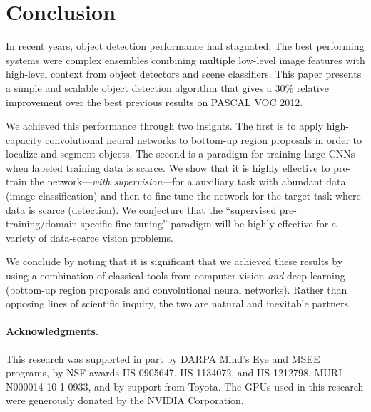 \section{Conclusion}

In recent years, object detection performance had stagnated.
The best performing systems were complex ensembles combining multiple low-level image features with high-level context from object detectors and scene classifiers.
This paper presents a simple and scalable object detection algorithm that gives a 30\% relative improvement over the best previous results on PASCAL VOC 2012.

We achieved this performance through two insights.
The first is to apply high-capacity convolutional neural networks to bottom-up region proposals in order to localize and segment objects.
The second is a paradigm for training large CNNs when labeled training data is scarce. We show that it is highly effective to pre-train the network---\emph{with supervision}---for a auxiliary task with abundant data (image classification) and then to fine-tune the network for the target task where data is scarce (detection).
We conjecture that the ``supervised pre-training/domain-specific fine-tuning'' paradigm will be highly effective for a variety of data-scarce vision problems.


We conclude by noting that it is significant that we achieved these results by using a combination of classical tools from computer vision \emph{and} deep learning (bottom-up region proposals and convolutional neural networks).
Rather than opposing lines of scientific inquiry, the two are natural and inevitable partners.



\paragraph{Acknowledgments.}
This research was supported in part by DARPA Mind's Eye and MSEE
programs, by NSF awards IIS-0905647, IIS-1134072, and IIS-1212798, MURI N000014-10-1-0933, and by support from Toyota.
The GPUs used in this research were generously donated by the NVIDIA Corporation.
